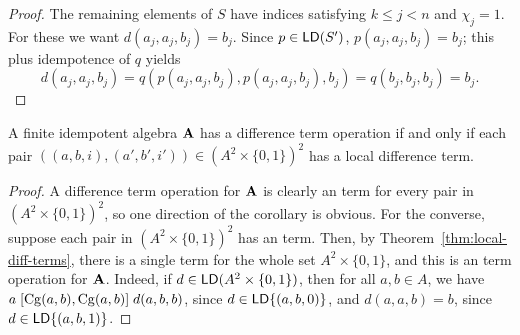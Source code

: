 \begin{proof}
The remaining elements of $S$
have indices satisfying $k\leq j < n$ and $\chi_j = 1$.
For these we want $d(a_j,a_j,b_j) = b_j$.
Since $p \in \mathsf{LD}(S')$, 
$p(a_j,a_j,b_j) = b_j$; this plus idempotence of $q$ yields
\begin{equation*}
 d(a_j,a_j,b_j) =  q(p(a_j,a_j,b_j), p(a_j,a_j,b_j), b_j)=  q(b_j, b_j, b_j) =b_j.
\end{equation*}
\end{proof}

\begin{corollary}
  \label{cor:loc-diff-term}
  A finite idempotent algebra $\mathbf{A} $ has a difference term operation if and
  only if each pair $((a,b,i), (a',b',i')) \in (A^2 \times \{0,1\})^2$ 
  has a local difference term.
\end{corollary}
\begin{proof}
  A difference term operation for $\mathbf{A} $ is clearly an \ld term for every pair in 
  $(A^2 \times \{0,1\})^2$, so one direction of the corollary is obvious.
  For the converse, suppose
  each pair in $(A^2 \times \{0,1\})^2$ has an \ld term. 
  Then, by Theorem~\ref{thm:local-diff-terms},
  there is a single \ld term for the whole set $A^2 \times \{0,1\}$,
  and this is an \ld term operation for $\mathbf{A} $.  Indeed, if
  $d \in \mathsf{LD}(A^2 \times \{0,1\})$, then
  for all $a, b \in A$, we have
  $a \mathrel{[\operatorname{Cg}(a,b), \operatorname{Cg}(a,b)]} d(a,b,b)$,
  since $d \in \mathsf{LD}\{(a,b,0)\}$, and
  $d(a,a,b) = b$, since $d\in \mathsf{LD}\{(a,b,1)\}$.
\end{proof}


